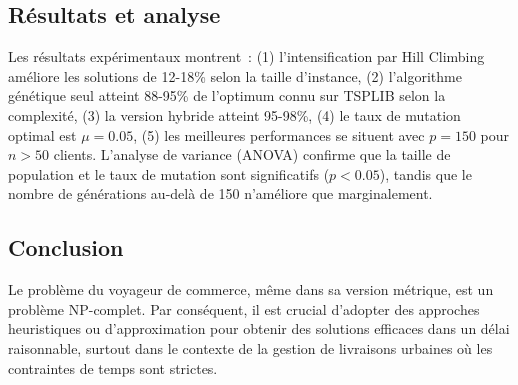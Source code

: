 \subsection*{Résultats et analyse}
{}

\noindent Les résultats expérimentaux montrent~: (1) l'intensification par Hill Climbing améliore les solutions de 12-18\% selon la taille d'instance, (2) l'algorithme génétique seul atteint 88-95\% de l'optimum connu sur TSPLIB selon la complexité, (3) la version hybride atteint 95-98\%, (4) le taux de mutation optimal est $\mu=0.05$, (5) les meilleures performances se situent avec $p=150$ pour $n > 50$ clients. L'analyse de variance (ANOVA) confirme que la taille de population et le taux de mutation sont significatifs ($p < 0.05$), tandis que le nombre de générations au-delà de 150 n'améliore que marginalement.


\newpage

\subsection*{Conclusion}
{}

Le problème du voyageur de commerce, même dans sa version métrique, est un problème NP-complet. Par conséquent, il est crucial d'adopter des approches heuristiques ou d'approximation pour obtenir des solutions efficaces dans un délai raisonnable, surtout dans le contexte de la gestion de livraisons urbaines où les contraintes de temps sont strictes.

\noindent                                                                                                                                                                                                                                                                                                                                                                                                                                                                                                                                                                                                                                                                                                                                                                                                                                                                                                                                          	
\newpage

